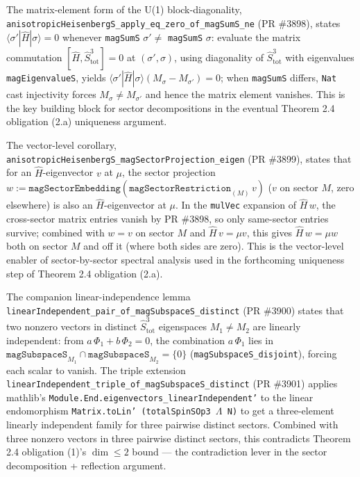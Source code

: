 \documentclass[a4paper,11pt]{article}
\begin{document}
The matrix-element form of the U(1) block-diagonality,
\texttt{anisotropicHeisenbergS\_apply\_eq\_zero\_of\_magSumS\_ne} (PR \#3898),
states \(\langle\sigma'|\hat H|\sigma\rangle=0\) whenever \texttt{magSumS}
\(\sigma'\ne\) \texttt{magSumS} \(\sigma\): evaluate the matrix commutation
\([\hat H,\hat S^3_{\mathrm{tot}}]=0\) at \((\sigma',\sigma)\), using diagonality
of \(\hat S^3_{\mathrm{tot}}\) with eigenvalues \texttt{magEigenvalueS},
yields \(\langle\sigma'|\hat H|\sigma\rangle(M_\sigma-M_{\sigma'})=0\); when
\texttt{magSumS} differs, \texttt{Nat} cast injectivity forces \(M_\sigma\ne M_{\sigma'}\)
and hence the matrix element vanishes.  This is the key building block for sector
decompositions in the eventual Theorem 2.4 obligation (2.a) uniqueness argument.

The vector-level corollary,
\texttt{anisotropicHeisenbergS\_magSectorProjection\_eigen} (PR \#3899), states
that for an \(\hat H\)-eigenvector \(v\) at \(\mu\), the sector projection
\(w := \texttt{magSectorEmbedding}(\texttt{magSectorRestriction}_{(M)}\,v)\) (\(v\)
on sector \(M\), zero elsewhere) is also an \(\hat H\)-eigenvector at \(\mu\).  In
the \texttt{mulVec} expansion of \(\hat H\,w\), the cross-sector matrix entries
vanish by PR \#3898, so only same-sector entries survive; combined with
\(w=v\) on sector \(M\) and \(\hat H\,v=\mu v\), this gives \(\hat H\,w=\mu w\)
both on sector \(M\) and off it (where both sides are zero).  This is the
vector-level enabler of sector-by-sector spectral analysis used in the
forthcoming uniqueness step of Theorem 2.4 obligation (2.a).

The companion linear-independence lemma
\texttt{linearIndependent\_pair\_of\_magSubspaceS\_distinct} (PR \#3900) states
that two nonzero vectors in distinct \(\hat S^3_{\mathrm{tot}}\) eigenspaces
\(M_1\ne M_2\) are linearly independent: from \(a\,\Phi_1 + b\,\Phi_2 = 0\), the
combination \(a\,\Phi_1\) lies in
\(\texttt{magSubspaceS}_{M_1}\cap\texttt{magSubspaceS}_{M_2}=\{0\}\)
(\texttt{magSubspaceS\_disjoint}), forcing each scalar to vanish.  The triple
extension \texttt{linearIndependent\_triple\_of\_magSubspaceS\_distinct} (PR
\#3901) applies mathlib's \texttt{Module.End.eigenvectors\_linearIndependent'} to
the linear endomorphism \texttt{Matrix.toLin'\,(totalSpinSOp3\,\(\Lambda\)\,N)}
to get a three-element linearly independent family for three pairwise distinct
sectors.  Combined with three nonzero vectors in three pairwise distinct
sectors, this contradicts Theorem 2.4 obligation (1)'s \(\dim\le2\) bound — the
contradiction lever in the sector decomposition + reflection argument.
\end{document}
